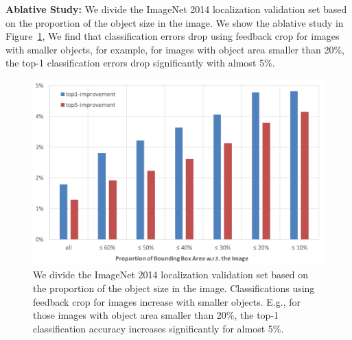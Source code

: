 \textbf{Ablative Study:} We divide the ImageNet 2014 localization validation set based on the proportion of the object size in the image. We show the ablative study in Figure~\ref{fig:reclassification_delta}, We find that classification errors drop using feedback crop for images with smaller objects, for example, for images with object area smaller than 20\%, the top-1 classification errors drop significantly with almost 5\%.

\setlength{\tabcolsep}{2pt}
\begin{figure}[htb]
\begin{center}
\includegraphics[width=\columnwidth]{figs/re-classification/delta.pdf}
\caption{We divide the ImageNet 2014 localization validation set based on the proportion of the object size in the image. Classifications using feedback crop for images increase with smaller objects. E.g., for those images with object area smaller than 20\%, the top-1 classification accuracy increases significantly for almost 5\%.}
\label{fig:reclassification_delta}
\end{center}
\end{figure}
